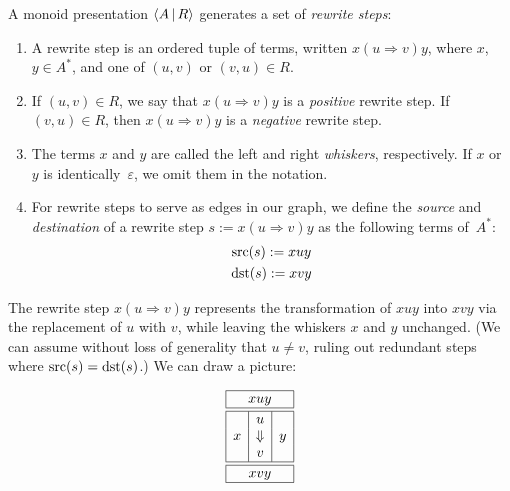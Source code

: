 \documentclass[../generics]{subfiles}
\begin{document}
\begin{definition}\label{rewrite step def} A monoid presentation $\langle A\,|\,R\rangle$ generates a set of \emph{rewrite steps}:
\begin{enumerate}
\item A rewrite step is an ordered tuple of terms, written \index{$\Rightarrow$}$x(u\Rightarrow v)y$, where $x$, $y\in A^*$, and one of $(u,v)$ or $(v,u)\in R$.
\item If $(u,v)\in R$, we say that $x(u\Rightarrow v)y$ is a \emph{positive} rewrite step. If $(v,u)\in R$, then $x(u\Rightarrow v)y$ is a \emph{negative} rewrite step.
\item The terms $x$ and $y$ are called the left and right \emph{whiskers}, respectively. If $x$ or $y$ is identically~$\varepsilon$, we omit them in the notation.
\item For rewrite steps to serve as edges in our graph, we define the \emph{source} and \emph{destination} of a rewrite step $s:= x(u\Rightarrow v)y$ as the following terms of~$A^*$:
\begin{gather*}
\operatorname{src}(s) := xuy\\
\operatorname{dst}(s) := xvy
\end{gather*}
\end{enumerate}
\end{definition}

The rewrite step $x(u\Rightarrow v)y$ represents the transformation of $xuy$ into $xvy$ via the replacement of $u$ with $v$, while leaving the whiskers $x$ and $y$ unchanged. (We can assume without loss of generality that $u\neq v$, ruling out redundant steps where $\operatorname{src}(s)=\operatorname{dst}(s)$.) We can draw a picture:
\begin{ceqn}
\[
\begin{array}{|c|c|c|}
\hline
\multicolumn{3}{|c|}{xuy}\\
\hline
\hline
&u&\\
x&\Downarrow&y\\
&v&\\
\hline
\hline
\multicolumn{3}{|c|}{xvy}\\
\hline
\end{array}
\]
\end{ceqn}
\end{document}
